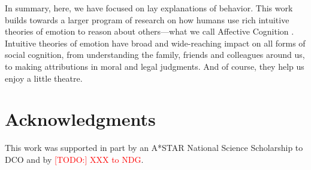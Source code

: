 \documentclass[10pt,letterpaper]{article}
\newcommand{\red}[1]{\textcolor{Red}{#1}}
\begin{document}

In summary, here, we have focused on lay explanations of behavior. This work builds towards a larger program of research on how humans use rich intuitive theories of emotion to reason about others---what we call Affective Cognition \cite{Ong2015AffCog}. Intuitive theories of emotion have broad and wide-reaching impact on all forms of social cognition, from understanding the family, friends and colleagues around us, to making attributions in moral and legal judgments. And of course, they help us enjoy a little theatre. 







\section{Acknowledgments}

This work was supported in part by an A*STAR National Science Scholarship to DCO and by \red{[TODO:] XXX to NDG}.




\setlength{\bibleftmargin}{.125in}
\setlength{\bibindent}{-\bibleftmargin}


\end{document}
